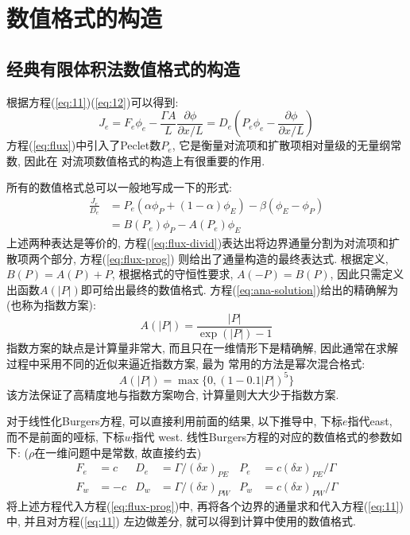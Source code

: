 \documentclass[hyperref,UTF8,titlepage]{ctexart}
\begin{document}
\section{数值格式的构造}
\label{sec:scheme}

\subsection{经典有限体积法数值格式的构造}
\label{sec:scheme-classical}
根据方程(\ref{eq:11})(\ref{eq:12})可以得到:
\begin{equation}
  \label{eq:flux}
  J_e=F_e\phi_e-\frac{\Gamma A}{L}\frac{\partial\phi}{\partial x/L}
     =D_e\left(P_e\phi_e-\frac{\partial\phi}{\partial x/L}\right)
\end{equation}
方程(\ref{eq:flux})中引入了Peclet数$P_e$, 它是衡量对流项和扩散项相对量级的无量纲常数, 因此在
对流项数值格式的构造上有很重要的作用.

所有的数值格式总可以一般地写成一下的形式:
\begin{align}
  \frac{J_e}{D_e} &= P_e(\alpha\phi_P+(1-\alpha)\phi_E)-\beta(\phi_E-\phi_P) \label{eq:flux-divid} \\
  &= B(P_e)\phi_P - A(P_e)\phi_E \label{eq:flux-prog}
\end{align}
上述两种表达是等价的, 方程(\ref{eq:flux-divid})表达出将边界通量分割为对流项和扩散项两个部分, 方程(\ref{eq:flux-prog})
则给出了通量构造的最终表达式. 根据定义, $B(P) = A(P) + P$, 根据格式的守恒性要求, $A(-P) = B(P)$, 
因此只需定义出函数$A(|P|)$即可给出最终的数值格式. 方程(\ref{eq:ana-solution})给出的精确解为(也称为指数方案):
\begin{equation}
  \label{eq:exp}
  A(|P|) = \frac{|P|}{\exp(|P|)-1}
\end{equation}
指数方案的缺点是计算量非常大, 而且只在一维情形下是精确解, 因此通常在求解过程中采用不同的近似来逼近指数方案, 最为
常用的方法是幂次混合格式:
\begin{equation}
  \label{eq:power-mix}
  A(|P|) = \max\{0, (1-0.1|P|)^5\}
\end{equation}
该方法保证了高精度地与指数方案吻合, 计算量则大大少于指数方案.

对于线性化Burgers方程, 可以直接利用前面的结果, 以下推导中, 下标$e$指代east, 而不是前面的哑标, 下标$w$指代
west. 线性Burgers方程的对应的数值格式的参数如下: ($\rho$在一维问题中是常数, 故直接约去)
\begin{align*}
  F_e&=c  & D_e&=\Gamma/(\delta x)_{PE} & P_e&=c(\delta x)_{PE}/\Gamma \\
  F_w&=-c & D_w&=\Gamma/(\delta x)_{PW} & P_w&=c(\delta x)_{PW}/\Gamma
\end{align*}
将上述方程代入方程(\ref{eq:flux-prog})中, 再将各个边界的通量求和代入方程(\ref{eq:11})中, 并且对方程(\ref{eq:11})
左边做差分, 就可以得到计算中使用的数值格式.
\end{document}
